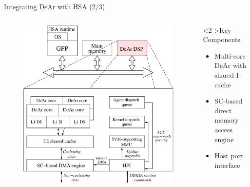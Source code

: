 \documentclass[handout]{beamer}
\begin{document}
\begin{CJK}{UTF8}{bkai}
            \begin{frame}{Integrating DeAr with HSA (2/3)}
                \begin{columns}
                    \begin{column}{0.6\textwidth}
                        \vspace{-1em}
                        \begin{figure}[!ht] 
                            \centering
                            \includegraphics[width=1.0\textwidth]{./figs/archi.eps}
                            \label{fig:archi}
                        \end{figure}
                    \end{column}
                    \begin{column}{0.40\textwidth}
                        \begin{block}<2->{Key Components}
                            \begin{itemize}
                                \item <3->{Multi-core DeAr with shared I-cache}
                                \item <4->{SC-based direct memory access engine}
                                \item <5->{Host port interface}
                            \end{itemize}
                        \end{block}
                    \end{column}
                \end{columns}
            \end{frame}


\end{CJK}
\end{document}
